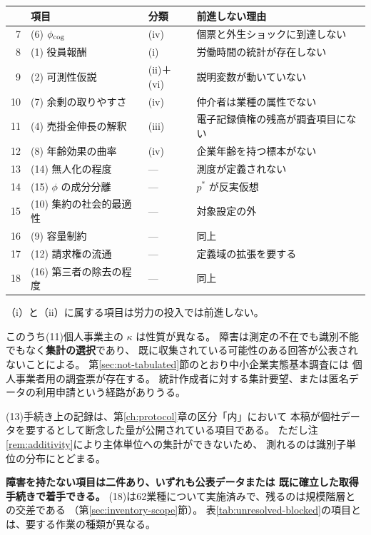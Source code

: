 \begin{center}
\begin{tabularx}{\textwidth}{@{}rXll@{}}
\toprule
 & 項目 & 分類 & 前進しない理由 \\
\midrule
7 & (6) $\phi_{\rm cog}$ & (iv) & 個票と外生ショックに到達しない \\
8 & (1) 役員報酬 & (i) & 労働時間の統計が存在しない \\
9 & (2) 可測性仮説 & (ii)＋(vi) & 説明変数が動いていない \\
10 & (7) 余剰の取りやすさ & (iv) & 仲介者は業種の属性でない \\
11 & (4) 売掛金伸長の解釈 & (iii) & 電子記録債権の残高が調査項目にない \\
12 & (8) 年齢効果の曲率 & (iv) & 企業年齢を持つ標本がない \\
13 & (14) 無人化の程度 & --- & 測度が定義されない \\
14 & (15) $\phi$ の成分分離 & --- & $p^{\ast}$ が反実仮想 \\
15 & (10) 集約の社会的最適性 & --- & 対象設定の外 \\
16 & (9) 容量制約 & --- & 同上 \\
17 & (12) 請求権の流通 & --- & 定義域の拡張を要する \\
18 & (16) 第三者の除去の程度 & --- & 同上 \\
\bottomrule
\end{tabularx}
\label{tab:unresolved-blocked}
\end{center}

（i）と（ii）に属する項目は労力の投入では前進しない。

このうち(11)個人事業主の $\kappa$ は性質が異なる。
障害は測定の不在でも識別不能でもなく\textbf{集計の選択}であり、
既に収集されている可能性のある回答が公表されないことによる。
第\ref{sec:not-tabulated}節のとおり中小企業実態基本調査には
個人事業者用の調査票が存在する。
統計作成者に対する集計要望、または匿名データの利用申請という経路がありうる。

(13)手続き上の記録は、第\ref{ch:protocol}章の区分「内」において
本稿が個社データを要するとして断念した量が公開されている項目である。
ただし注\ref{rem:additivity}により主体単位への集計ができないため、
測れるのは識別子単位の分布にとどまる。

\textbf{障害を持たない項目は二件あり、いずれも公表データまたは
既に確立した取得手続きで着手できる。}
(18)は62業種について実施済みで、残るのは規模階層との交差である
（第\ref{sec:inventory-scope}節）。
表\ref{tab:unresolved-blocked}の項目とは、要する作業の種類が異なる。

